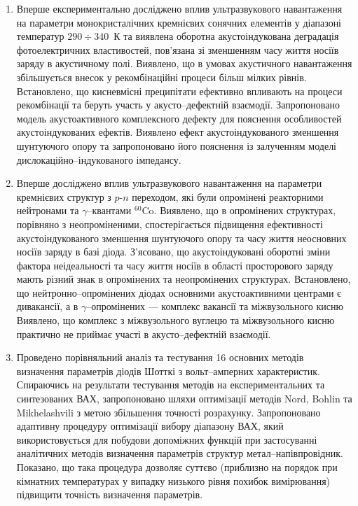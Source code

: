 \begin{enumerate}[leftmargin=0cm,itemindent=3em]
  \item Вперше експериментально досліджено вплив ультразвукового навантаження на параметри монокристалічних кремнієвих сонячних елементів у діапазоні температур $290\div340$~К
  та виявлена оборотна акустоіндукована деградація фотоелектричних властивостей, пов'язана зі зменшенням часу життя носіїв заряду в акустичному полі.
  Виявлено, що в умовах акустичного навантаження збільшується внесок у рекомбінаційні процеси більш мілких рівнів.
  Встановлено, що кисневмісні преципітати ефективно впливають на процеси рекомбінації та беруть участь у акусто--дефектній взаємодії.
  Запропоновано модель акустоактивного комплексного дефекту для пояснення особливостей акустоіндукованих ефектів.
 Виявлено ефект акустоіндукованого зменшення шунтуючого опору та запропоновано його пояснення із залученням моделі дислокаційно--індукованого імпедансу.

\item Вперше досліджено вплив ультразвукового навантаження на параметри кремнієвих структур з $p$-$n$ переходом, які були опромінені реакторними нейтронами та $\gamma$--квантами $^{60}$Co.
      Виявлено, що в опромінених структурах, порівняно з неопроміненими, спостерігається підвищення ефективності акустоіндукованого зменшення шунтуючого опору та часу життя неосновних носіїв заряду в базі діода.
      З'ясовано, що акустоіндуковані оборотні зміни фактора неідеальності та часу життя носіїв в області просторового заряду   мають різний знак в опромінених та неопромінених структурах.
      Встановлено, що нейтронно--опромінених діодах основними акустоактивними центрами є дивакансії,
      а в $\gamma$--опромінених --- комплекс вакансії та міжвузольного кисню
     Виявлено, що комплекс з міжвузольного вуглецю та міжвузольного кисню практично не приймає участі в акусто--дефектній взаємодії.

\item  Проведено порівняльний аналіз та тестування 16 основних методів визначення параметрів діодів Шотткі з вольт--амперних характеристик.
         Спираючись на результати тестування методів на експериментальних та синтезованих  ВАХ,
         запропоновано шляхи оптимізації методів Nord, Bohlin та Mikhelashvili з метою збільшення точності розрахунку.
      Запропоновано адаптивну процедуру оптимізації вибору діапазону ВАХ, який використовується для побудови допоміжних функцій при застосуванні аналітичних методів визначення параметрів структур метал--напівпровідник.
       Показано, що така процедура дозволяє суттєво (приблизно на порядок при кімнатних температурах у випадку низького рівня похибок вимірювання) підвищити точність визначення параметрів.


\end{enumerate}
